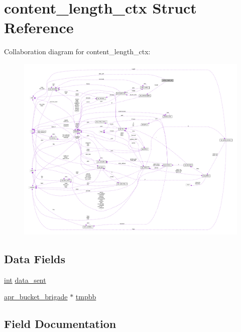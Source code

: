 \hypertarget{structcontent__length__ctx}{}\section{content\+\_\+length\+\_\+ctx Struct Reference}
\label{structcontent__length__ctx}


Collaboration diagram for content\+\_\+length\+\_\+ctx\+:
\nopagebreak
\begin{figure}[H]
\begin{center}
\leavevmode
\includegraphics[width=350pt]{structcontent__length__ctx__coll__graph}
\end{center}
\end{figure}
\subsection*{Data Fields}
\begin{DoxyCompactItemize}
\item 
\hyperlink{pcre_8txt_a42dfa4ff673c82d8efe7144098fbc198}{int} \hyperlink{structcontent__length__ctx_ac040425bbff5b78b072997df210991d4}{data\+\_\+sent}
\item 
\hyperlink{structapr__bucket__brigade}{apr\+\_\+bucket\+\_\+brigade} $\ast$ \hyperlink{structcontent__length__ctx_afd2c78cf7cd2dcd4fb0926cf2313967d}{tmpbb}
\end{DoxyCompactItemize}


\subsection{Field Documentation}
